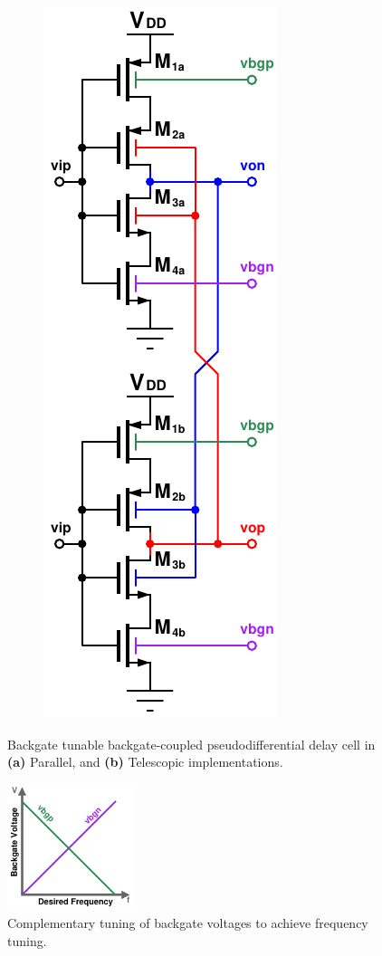 \begin{figure}[htb!]
\begin{subfigure}{0.5\textwidth}
			        \includegraphics[height=0.5\textheight, angle=0]{./figs/design/tele_delay_cell2}
			        \caption{ }
			        \label{fig:telescopic_delay_cell}
			    \end{subfigure}
			    \label{fig:tunable_delay_cells}
			    \caption{Backgate tunable backgate-coupled pseudodifferential delay cell in \textbf{(a)} Parallel, and \textbf{(b)} Telescopic implementations.}
			\end{figure} 

			\begin{figure}[htb!]
			    \centering
			    \includegraphics[width=0.33\textwidth, angle=0]{./figs/design/tuning}
			    \caption{Complementary tuning of backgate voltages to achieve frequency tuning.}
			    \label{fig:bg_tuning_scheme}
			\end{figure}

